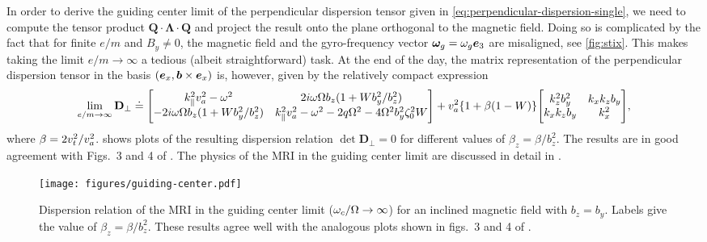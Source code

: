 \documentclass[aps,pre,notitlepage,amsmath,amssymb,amsfonts,nobibnotes,nofootinbib,superscriptaddress]{revtex4-1}
\begin{document}
In order to derive the guiding center limit of the perpendicular dispersion
tensor given in \cref{eq:perpendicular-dispersion-single}, we need to compute
the tensor product $\mathbf{Q}\cdot\mathbf{\Lambda}\cdot\mathbf{Q}$ and
project the result onto the plane orthogonal to the magnetic field. Doing so
is complicated by the fact that for finite $e/m$ and $B_y\ne{}0$, the magnetic
field and the gyro-frequency vector $\bm{\omega}_g=\omega_g\bm{e}_3$ are misaligned, see
\cref{fig:stix}. This makes taking the limit $e/m\to\infty$ a tedious (albeit
straightforward) task. At the end of the day, the matrix representation of the
perpendicular dispersion tensor 
in the basis $(\bm{e}_x,\bm{b}\times\bm{e}_x)$ is, however, given by the relatively
compact expression
\begingroup
\renewcommand*{\arraystretch}{1.4}
\begin{equation}
  \label{eq:DRguiding}
  \lim_{e/m\to\infty}\mathbf{D}_\perp \doteq
  \Bigg[\begin{matrix}
    k_\parallel^2\va^2 - \omega^2
    & 2i\omega\Omega b_z (1 + Wb_y^2/b_z^2) \\
    - 2i\omega\Omega b_z (1 + Wb_y^2/b_z^2)
    & k_\parallel^2\va^2 - \omega^2 - 2q\Omega^2 - 4\Omega^2b_y^2\zeta_0^2W
  \end{matrix}\Bigg]
  + \va^2\{1 + \beta(1-W)\}
  \Bigg[\begin{matrix}
    k_z^2 b_y^2 & k_x k_z b_y \\
    k_x k_z b_y & k_x^2
  \end{matrix}\Bigg],
\end{equation}
\endgroup
where $\beta=2v_t^2/v_a^2$.  shows plots of the
resulting dispersion relation $\det\mathbf{D}_\perp=0$ for different values of
$\beta_z=\beta/b_z^2$. The results are in good agreement with Figs.~3 and 4 of
\citet{Quataert2002}. The physics of the MRI in the guiding center limit are
discussed in detail in \citet{Quataert2002} \citep[see also][]{Balbus2004}.

\begin{figure}
  \centering\texttt{[image: figures/guiding-center.pdf]}
  \caption{Dispersion relation of the MRI in the guiding center limit
    ($\omega_c/\Omega\to\infty$) for an inclined magnetic field with $b_z=b_y$.
    Labels give the value of $\beta_z=\beta/b_z^2$. These results agree well
    with the analogous plots shown in figs.~3 and 4 of
    \citet{Quataert2002}.}\label{fig:guiding-center}
\end{figure}
\end{document}
